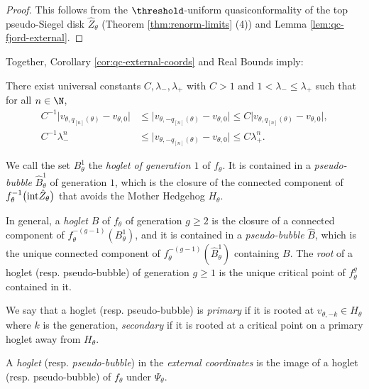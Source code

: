 \documentclass{amsart}
\begin{document}
\begin{proof}
    This follows from the $\threshold$-uniform quasiconformality of the top pseudo-Siegel disk $\hat{Z}_{\theta}$ (Theorem \ref{thm:renorm-limits} (4)) and Lemma \ref{lem:qc-fjord-external}.
\end{proof}

Together, Corollary \ref{cor:qc-external-coords} and Real Bounds imply:

\begin{corollary}
\label{cor:universal-scaling-law}
    There exist universal constants $C, \lambda_-, \lambda_+$ with $C>1$ and $1< \lambda_- \leq \lambda_+$ such that for all $n \in \N$,
    \begin{align*}
        C^{-1} \big| v_{\theta,q_{[n]}(\theta)} - v_{\theta,0} \big| 
        & \leq \big| v_{\theta,-q_{[n]}(\theta)} - v_{\theta,0} \big| \leq 
        C \big| v_{\theta,q_{[n]}(\theta)} - v_{\theta,0} \big|, \\
        C^{-1} \lambda_-^n 
        &\leq \big| v_{\theta,-q_{[n]}(\theta)} - v_{\theta,0} \big| \leq C \lambda_+^n.
    \end{align*}
\end{corollary}

\begin{definition}
    We call the set $B_{\theta}^1$ the \emph{hoglet of generation $1$} of $f_{\theta}$.
    It is contained in a \emph{pseudo-bubble} $\hat{B}_{\theta}^1$ of generation $1$, which is the closure of the connected component of $f_{\theta}^{-1}\big( \textnormal{int}\hat{Z}_{\theta}\big)$ that avoids the Mother Hedgehog $H_{\theta}$. 
        
    In general, a \emph{hoglet} $B$ of $f_{\theta}$ of generation $g \geq 2$ is the closure of a connected component of $f_{\theta}^{-(g-1)}(B_{\theta}^1)$, and it is contained in a \emph{pseudo-bubble} $\hat{B}$, which is the unique connected component of $f_{\theta}^{-(g-1)}(\hat{B}_{\theta}^1)$ containing $B$. 
    The \emph{root} of a hoglet (resp. pseudo-bubble) of generation $g\geq 1$ is the unique critical point of $f_{\theta}^{g}$ contained in it.
        
    We say that a hoglet (resp. pseudo-bubble) is \emph{primary} if it is rooted at $v_{\theta,-k} \in H_\theta$ where $k$ is the generation, \emph{secondary} if it is rooted at a critical point on a primary hoglet away from $H_\theta$.

    A \emph{hoglet} (resp. \emph{pseudo-bubble}) in the \emph{external coordinates} is the image of a hoglet (resp. pseudo-bubble) of $f_\theta$ under $\Psi_\theta$.
\end{definition}
\end{document}
